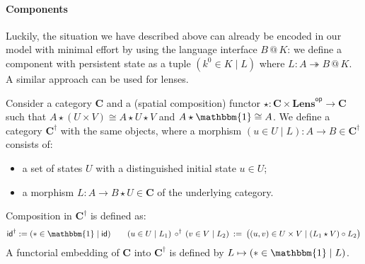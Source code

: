 \documentclass[acmsmall,screen,review,anonymous]{acmart}
\newcommand{\kw}[1]{\ensuremath{ \mathsf{#1} }}
\newcommand{\intl}[1]{#1^0}
\begin{document}
\paragraph{Components} %

Luckily,
the situation we have described above
can already be encoded in our model with minimal effort
by using the language interface $B \mathbin@ K$:
we define a component with persistent state as a tuple
$(\intl{k} \in K \mid L)$
where
$L : A \twoheadrightarrow B \mathbin@ K$.
A similar approach can be used for lenses.

\begin{definition} \label{def:slts} %
Consider a category $\mathbf{C}$
and a (spatial composition) functor
${\star} : \mathbf{C} \times \mathbf{Lens}^\kw{op} \rightarrow \mathbf{C}$
such that
$
  A \star (U \times V) \cong A \star U \star V
$ and $
  A \star \mathbbm{1} \cong A
$.
We define a category $\mathbf{C}^\dagger$
with the same objects,
where a morphism
$(u \in U \mid L) : A \rightarrow B \in \mathbf{C}^\dagger$
consists of:
\begin{itemize}
  \item a set of states $U$ with a distinguished initial state $u \in U$;
  \item a morphism $L : A \rightarrow B \star U \in \mathbf{C}$
    of the underlying category.
\end{itemize}
Composition in $\mathbf{C}^\dagger$ is defined as:
\[
  \kw{id}^\dagger := (* \in \mathbbm{1} \mid \kw{id})
  \qquad
  (u \in U \mid L_1) \,\circ^\dagger\, (v \in V \mid L_2) \::=\:
  \big( (u, v) \in U \times V \mid
        (L_1 \star V) \circ L_2 \big)
\]
A functorial embedding of $\mathbf{C}$ into $\mathbf{C}^\dagger$
is defined by $L \mapsto (* \in \mathbbm{1} \mid L)$.
\end{definition}
\end{document}
